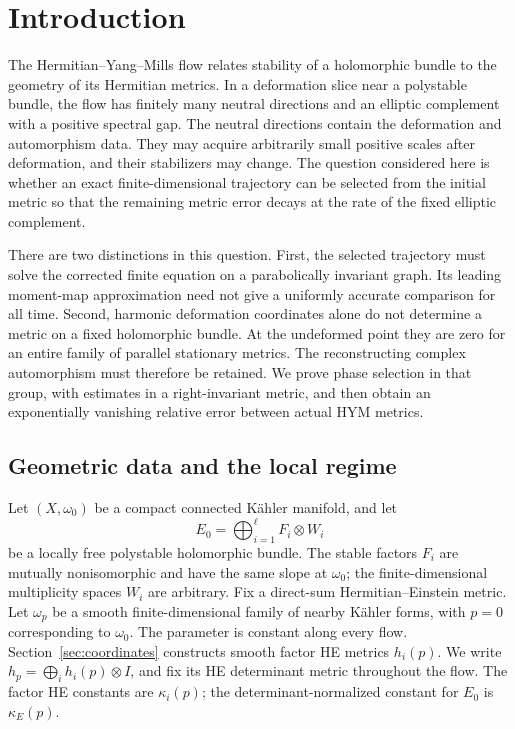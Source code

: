 \section{Introduction}\label{sec:intro}

The Hermitian--Yang--Mills flow relates stability of a holomorphic bundle
to the geometry of its Hermitian metrics. In a deformation slice near a
polystable bundle, the flow has finitely many neutral directions and an elliptic
complement with a positive spectral gap. The neutral directions contain
the deformation and automorphism data. They may acquire arbitrarily
small positive scales after deformation, and their stabilizers may change.
The question considered here is whether an exact finite-dimensional
trajectory can be selected from the initial metric so that the remaining
metric error decays at the rate of the fixed elliptic complement.

There are two distinctions in this question. First, the selected
trajectory must solve the corrected finite equation on a parabolically
invariant graph. Its leading moment-map approximation need not give a
uniformly accurate comparison for all time. Second, harmonic deformation
coordinates alone do not determine a metric on a fixed holomorphic bundle.
At the undeformed point they are zero for an entire family of parallel
stationary metrics. The reconstructing complex automorphism must therefore
be retained. We prove phase selection in that group, with estimates in a
right-invariant metric, and then obtain an exponentially vanishing relative
error between actual HYM metrics.

\subsection{Geometric data and the local regime}
Let $(X,\omega_0)$ be a compact connected K\"ahler manifold, and let
\begin{equation}\label{eq:split}
 E_0=\bigoplus_{i=1}^\ell F_i\otimes W_i
\end{equation}
be a locally free polystable holomorphic bundle. The stable factors $F_i$
are mutually nonisomorphic and have the same slope at $\omega_0$;
the finite-dimensional multiplicity spaces $W_i$ are arbitrary.
Fix a direct-sum Hermitian--Einstein metric. Let $\omega_p$ be a smooth
finite-dimensional family of nearby K\"ahler forms, with $p=0$
corresponding to $\omega_0$. The parameter is constant along every flow.
Section~\ref{sec:coordinates} constructs smooth factor HE metrics $h_i(p)$.
We write $h_p=\bigoplus_i h_i(p)\otimes I$, and fix its HE determinant
metric throughout the flow. The factor HE constants are $\kappa_i(p)$;
the determinant-normalized constant for $E_0$ is $\kappa_E(p)$.

